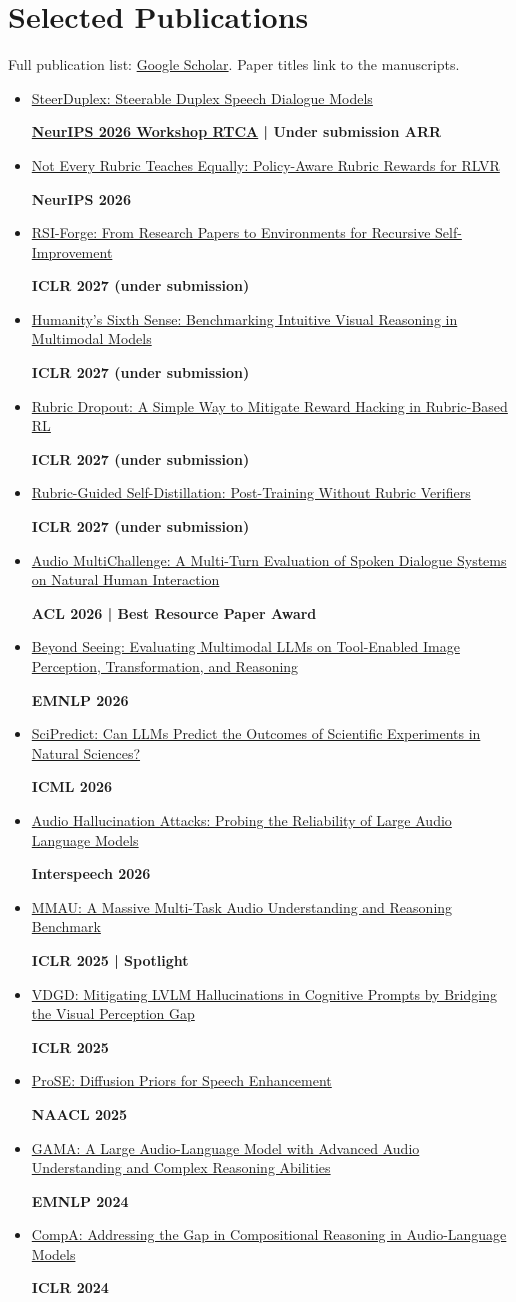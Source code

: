 \documentclass[letterpaper,11pt]{article}
\newcommand{\pub}[3]{%
  \item\href{#1}{#2}\par
  {\small\textbf{#3}}}
\begin{document}
\section{Selected Publications}
{\footnotesize Full publication list: \href{https://scholar.google.com/citations?user=RLjKaTwAAAAJ&hl=en}{Google Scholar}. Paper titles link to the manuscripts.}
\begin{itemize}[itemsep=1pt,topsep=4pt]
  \pub{https://arxiv.org/abs/2609.12623}
    {SteerDuplex: Steerable Duplex Speech Dialogue Models}
    {\href{https://rtcaneurips26.github.io/}{NeurIPS 2026 Workshop RTCA} \enspace | \enspace Under submission ARR}
  \pub{https://arxiv.org/abs/2605.20164}
    {Not Every Rubric Teaches Equally: Policy-Aware Rubric Rewards for RLVR}
    {NeurIPS 2026}
  \pub{https://arxiv.org/abs/2610.09426}
    {RSI-Forge: From Research Papers to Environments for Recursive Self-Improvement}
    {ICLR 2027 (under submission)}
  \pub{https://arxiv.org/abs/2610.08966}
    {Humanity's Sixth Sense: Benchmarking Intuitive Visual Reasoning in Multimodal Models}
    {ICLR 2027 (under submission)}
  \pub{https://arxiv.org/abs/2608.11669}
    {Rubric Dropout: A Simple Way to Mitigate Reward Hacking in Rubric-Based RL}
    {ICLR 2027 (under submission)}
  \pub{https://arxiv.org/abs/2606.12507}
    {Rubric-Guided Self-Distillation: Post-Training Without Rubric Verifiers}
    {ICLR 2027 (under submission)}
  \pub{https://aclanthology.org/2026.acl-long.1654/}
    {Audio MultiChallenge: A Multi-Turn Evaluation of Spoken Dialogue Systems on Natural Human Interaction}
    {ACL 2026 \enspace | \enspace Best Resource Paper Award}
  \pub{https://aclanthology.org/2026.emnlp-main.1711/}
    {Beyond Seeing: Evaluating Multimodal LLMs on Tool-Enabled Image Perception, Transformation, and Reasoning}
    {EMNLP 2026}
  \pub{https://arxiv.org/abs/2604.10718}
    {SciPredict: Can LLMs Predict the Outcomes of Scientific Experiments in Natural Sciences?}
    {ICML 2026}
  \pub{https://arxiv.org/abs/2603.29263}
    {Audio Hallucination Attacks: Probing the Reliability of Large Audio Language Models}
    {Interspeech 2026}
  \pub{https://openreview.net/forum?id=TeVAZXr3yv}
    {MMAU: A Massive Multi-Task Audio Understanding and Reasoning Benchmark}
    {ICLR 2025 \enspace | \enspace Spotlight}
  \pub{https://openreview.net/forum?id=3PRvlT8b1R}
    {VDGD: Mitigating LVLM Hallucinations in Cognitive Prompts by Bridging the Visual Perception Gap}
    {ICLR 2025}
  \pub{https://aclanthology.org/2025.naacl-long.619/}
    {ProSE: Diffusion Priors for Speech Enhancement}
    {NAACL 2025}
  \pub{https://aclanthology.org/2024.emnlp-main.361/}
    {GAMA: A Large Audio-Language Model with Advanced Audio Understanding and Complex Reasoning Abilities}
    {EMNLP 2024}
  \pub{https://arxiv.org/abs/2310.08753}
    {CompA: Addressing the Gap in Compositional Reasoning in Audio-Language Models}
    {ICLR 2024}
\end{itemize}
\end{document}
